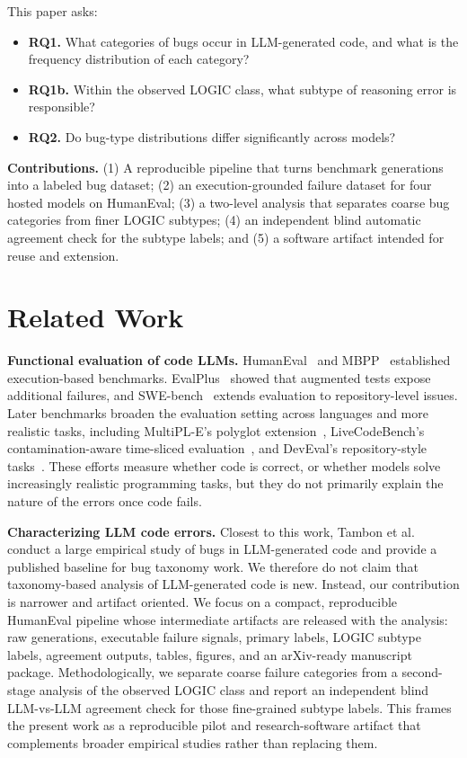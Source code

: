 \documentclass[10pt,journal]{article}
\begin{document}
This paper asks:
\begin{itemize}
  \item \textbf{RQ1.} What categories of bugs occur in LLM-generated code, and what
  is the frequency distribution of each category?
  \item \textbf{RQ1b.} Within the observed LOGIC class, what subtype of reasoning
  error is responsible?
  \item \textbf{RQ2.} Do bug-type distributions differ significantly across models?
\end{itemize}

\noindent\textbf{Contributions.}
(1) A reproducible pipeline that turns benchmark generations into a labeled bug
dataset; (2) an execution-grounded failure dataset for four hosted models on
HumanEval; (3) a two-level analysis that separates coarse bug categories from
finer LOGIC subtypes; (4) an independent blind automatic agreement check for the
subtype labels; and (5) a software artifact intended for reuse and extension.

\section{Related Work}
\textbf{Functional evaluation of code LLMs.}
HumanEval~\cite{chen2021codex} and MBPP~\cite{austin2021mbpp} established
execution-based benchmarks. EvalPlus~\cite{liu2023evalplus} showed that augmented
tests expose additional failures, and SWE-bench~\cite{jimenez2024swebench} extends
evaluation to repository-level issues. Later benchmarks broaden the evaluation
setting across languages and more realistic tasks, including MultiPL-E's polyglot
extension~\cite{cassano2023multipl}, LiveCodeBench's contamination-aware
time-sliced evaluation~\cite{jain2024livecodebench}, and DevEval's repository-style
tasks~\cite{li2024deveval}. These efforts measure whether code is correct, or
whether models solve increasingly realistic programming tasks, but they do not
primarily explain the nature of the errors once code fails.

\textbf{Characterizing LLM code errors.}
Closest to this work, Tambon et al.~\cite{tambon2024bugs} conduct a large empirical
study of bugs in LLM-generated code and provide a published baseline for bug
taxonomy work. We therefore do not claim that taxonomy-based analysis of
LLM-generated code is new. Instead, our contribution is narrower and artifact
oriented. We focus on a compact, reproducible HumanEval pipeline whose intermediate
artifacts are released with the analysis: raw generations, executable failure signals,
primary labels, LOGIC subtype labels, agreement outputs, tables, figures, and an
arXiv-ready manuscript package. Methodologically, we separate coarse failure
categories from a second-stage analysis of the observed LOGIC class and report an
independent blind LLM-vs-LLM agreement check for those fine-grained subtype labels.
This frames the present work as a reproducible pilot and research-software
artifact that complements broader empirical studies rather than replacing them.
\end{document}
